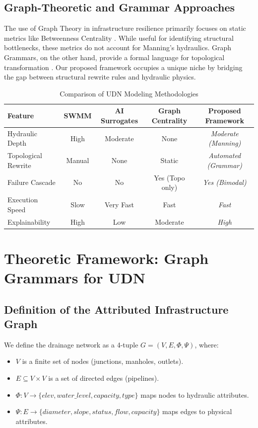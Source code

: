 \documentclass[conference]{IEEEtran}
\begin{document}
\subsection{Graph-Theoretic and Grammar Approaches}
The use of Graph Theory in infrastructure resilience primarily focuses on static metrics like Betweenness Centrality \cite{b7}. While useful for identifying structural bottlenecks, these metrics do not account for Manning's hydraulics. Graph Grammars, on the other hand, provide a formal language for topological transformation \cite{b2}. Our proposed framework occupies a unique niche by bridging the gap between structural rewrite rules and hydraulic physics.

\begin{table}[t]
\caption{Comparison of UDN Modeling Methodologies}
\begin{center}
\renewcommand{\arraystretch}{1.2}
\begin{tabular}{|l|c|c|c|c|}
\hline
\textbf{Feature} & \textbf{SWMM} & \textbf{AI Surrogates} & \textbf{Graph Centrality} & \textbf{Proposed Framework} \\
\hline
Hydraulic Depth & High & Moderate & None & \textit{Moderate (Manning)} \\
Topological Rewrite & Manual & None & Static & \textit{Automated (Grammar)} \\
Failure Cascade & No & No & Yes (Topo only) & \textit{Yes (Bimodal)} \\
Execution Speed & Slow & Very Fast & Fast & \textit{Fast} \\
Explainability & High & Low & Moderate & \textit{High} \\
\hline
\end{tabular}
\label{tab1}
\end{center}
\end{table}

\section{Theoretic Framework: Graph Grammars for UDN}
\subsection{Definition of the Attributed Infrastructure Graph}
We define the drainage network as a 4-tuple $G = (V, E, \Phi, \Psi)$, where:
\begin{itemize}
    \item $V$ is a finite set of nodes (junctions, manholes, outlets).
    \item $E \subseteq V \times V$ is a set of directed edges (pipelines).
    \item $\Phi: V \to \{elev, water\_level, capacity, type\}$ maps nodes to hydraulic attributes.
    \item $\Psi: E \to \{diameter, slope, status, flow, capacity\}$ maps edges to physical attributes.
\end{itemize}
\end{document}
